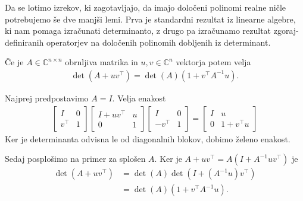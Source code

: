 Da se lotimo izrekov, ki zagotavljajo, da imajo določeni polinomi realne ničle potrebujemo še dve manjši lemi. Prva je standardni rezultat iz linearne algebre, ki nam pomaga izračunati determinanto\cite{matrix-determinant-lemma}, z drugo pa izračunamo rezultat zgoraj-definiranih operatorjev na določenih polinomih dobljenih iz determinant.
\begin{lema}\label{matrix-det-lemma}
    Če je \(A\in \mathbb C^{n\times n}\) obrnljiva matrika in \(u, v \in \mathbb C^n\) vektorja potem velja
    \begin{align*}
        \det(A + uv^\top) = \det(A) (1 + v^\top A^{-1} u).
    \end{align*}
\end{lema}
\begin{dokaz}
    Najprej predpostavimo \(A=I\). Velja enakost
    \begin{align*}
        \begin{bmatrix}
            I & 0 \\
            v^\top & 1
        \end{bmatrix}
        \begin{bmatrix}
            I + uv^\top & u \\
            0 & 1
        \end{bmatrix}
        \begin{bmatrix}
            I & 0 \\
            -v^\top & 1
        \end{bmatrix}
        =
        \begin{bmatrix}
            I & u \\
            0 & 1 + v^\top u
        \end{bmatrix}
    \end{align*}
    Ker je determinanta odvisna le od diagonalnih blokov, dobimo želeno enakost.

    Sedaj posplošimo na primer za splošen \(A\). Ker je \(A+uv^\top= A(I + A^{-1}uv^\top)\) je
    \begin{align*}
        \det(A + uv^\top) &= \det(A) \det(I + (A^{-1}u)v^\top)\\
         &= \det(A) (1 + v^\top A^{-1} u).
    \end{align*}
\end{dokaz}

